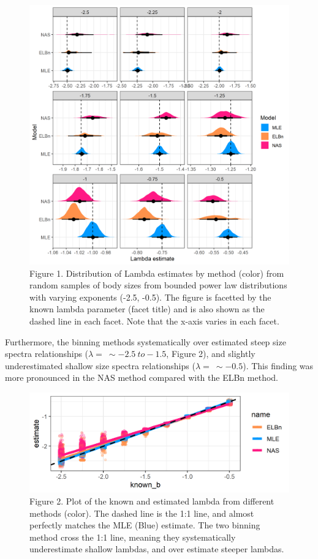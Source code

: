 \documentclass[
]{article}
\begin{document}
\begin{figure}
\centering
\includegraphics{figures/est_lambda_est_b_density.png}
\caption{Figure 1. Distribution of Lambda estimates by method (color)
from random samples of body sizes from bounded power law distributions
with varying exponents (-2.5, -0.5). The figure is facetted by the known
lambda parameter (facet title) and is also shown as the dashed line in
each facet. Note that the x-axis varies in each facet.}
\end{figure}

Furthermore, the binning methods systematically over estimated steep
size spectra relationships (\(\lambda = ~\sim-2.5~to-1.5\), Figure 2),
and slightly underestimated shallow size spectra relationships
(\(\lambda = ~\sim-0.5\)). This finding was more pronounced in the NAS
method compared with the ELBn method.

\begin{figure}
\centering
\includegraphics{figures/known_est_b_line.png}
\caption{Figure 2. Plot of the known and estimated lambda from different
methods (color). The dashed line is the 1:1 line, and almost perfectly
matches the MLE (Blue) estimate. The two binning method cross the 1:1
line, meaning they systematically underestimate shallow lambdas, and
over estimate steeper lambdas.}
\end{figure}
\end{document}
